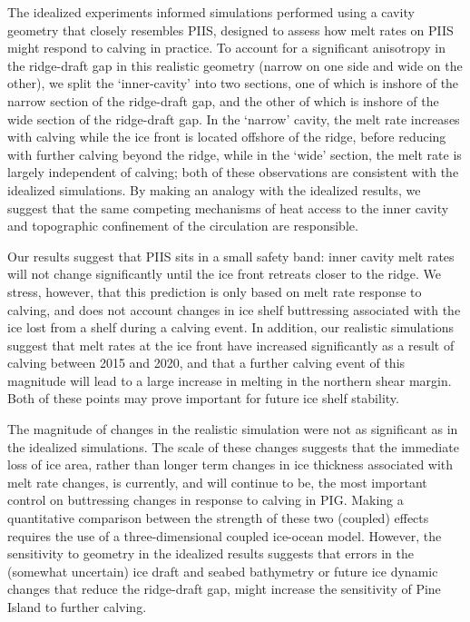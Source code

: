 \documentclass[draft]{agujournal2019}
\begin{document}
The idealized experiments informed simulations performed using a cavity geometry that closely resembles PIIS, designed to assess how melt rates on PIIS might respond to calving in practice. To account for a significant anisotropy in the ridge-draft gap in this realistic geometry (narrow on one side and wide on the other), we split the `inner-cavity' into two sections, one of which is inshore of the narrow section of the ridge-draft gap, and the other of which is inshore of the wide section of the ridge-draft gap. In the `narrow' cavity, the melt rate increases with calving while the ice front is located offshore of the ridge, before reducing with further calving beyond the ridge, while in the `wide' section, the melt rate is largely independent of calving; both of these observations are consistent with the idealized simulations. By making an analogy with the idealized results, we suggest that the same competing mechanisms of heat access to the inner cavity and topographic confinement of the circulation are responsible.

Our results suggest that PIIS sits in a small safety band: inner cavity melt rates will not change significantly until the ice front retreats closer to the ridge. We stress, however, that this prediction is only based on melt rate response to calving, and does not account changes in ice shelf buttressing associated with the ice lost from a shelf during a calving event. In addition, our realistic simulations suggest that melt rates at the ice front have increased significantly as a result of calving between 2015 and 2020, and that a further calving event of this magnitude will lead to a large increase in melting in the northern shear margin. Both of these points may prove important for future ice shelf stability.

The magnitude of changes in the realistic simulation were not as significant as in the idealized simulations. The scale of these changes suggests that the immediate loss of ice area, rather than longer term changes in ice thickness associated with melt rate changes, is currently, and will continue to be, the most important control on buttressing changes in response to calving in PIG. Making a quantitative comparison between the strength of these two (coupled) effects requires the use of a three-dimensional coupled ice-ocean model. However, the sensitivity to geometry in the idealized results suggests that errors in the (somewhat uncertain) ice draft and seabed bathymetry or future ice dynamic changes that reduce the ridge-draft gap, might increase the sensitivity of Pine Island to further calving.
\end{document}
